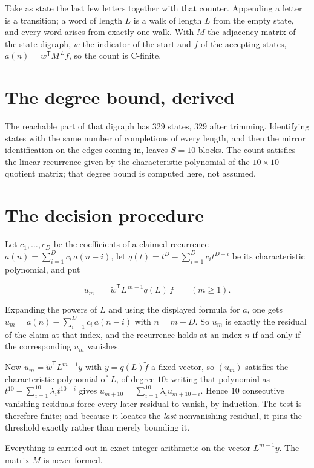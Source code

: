\documentclass[11pt]{article}
\theoremstyle{definition}
\begin{document}
Take as state the last few letters together with that counter. Appending a letter is a transition; a word of length $L$ is a walk of length $L$ from the empty state, and every word arises from exactly one walk. With $M$ the adjacency matrix of the state digraph, $w$ the indicator of the start and $f$ of the accepting states, $a(n) = w^{\mathsf T}M^{\,L}f$, so the count is C-finite.

\section{The degree bound, derived}

The reachable part of that digraph has $329$ states, $329$ after trimming. Identifying states with the same number of completions of every length, and then the mirror identification on the edges coming in, leaves $S = 10$ blocks. The count satisfies the linear recurrence given by the characteristic polynomial of the $10\times10$ quotient matrix; that degree bound is computed here, not assumed.

\section{The decision procedure}

Let $c_1,\dots,c_D$ be the coefficients of a claimed recurrence $a(n) = \sum_{i=1}^{D} c_i\,a(n-i)$, let $q(t) = t^{D} - \sum_{i=1}^{D} c_i t^{D-i}$ be its characteristic polynomial, and put

\[u_m \;=\; \tilde w^{\mathsf T} L^{\,m-1} q(L)\,\tilde f \qquad (m \ge 1).\]

Expanding the powers of $L$ and using the displayed formula for $a$, one gets $u_m = a(n) - \sum_{i=1}^{D} c_i\,a(n-i)$ with $n = m + D$. So $u_m$ is exactly the residual of the claim at that index, and the recurrence holds at an index $n$ if and only if the corresponding $u_m$ vanishes.

Now $u_m = \tilde w^{\mathsf T} L^{m-1} y$ with $y = q(L)\tilde f$ a fixed vector, so $(u_m)$ satisfies the characteristic polynomial of $L$, of degree $10$: writing that polynomial as $t^{10} - \sum_{i=1}^{10} \lambda_i t^{10-i}$ gives $u_{m+10} = \sum_{i=1}^{10} \lambda_i u_{m+10-i}$. Hence $10$ consecutive vanishing residuals force every later residual to vanish, by induction. The test is therefore finite; and because it locates the {\itshape last} nonvanishing residual, it pins the threshold exactly rather than merely bounding it.

Everything is carried out in exact integer arithmetic on the vector $L^{m-1}y$. The matrix $M$ is never formed.
\end{document}
